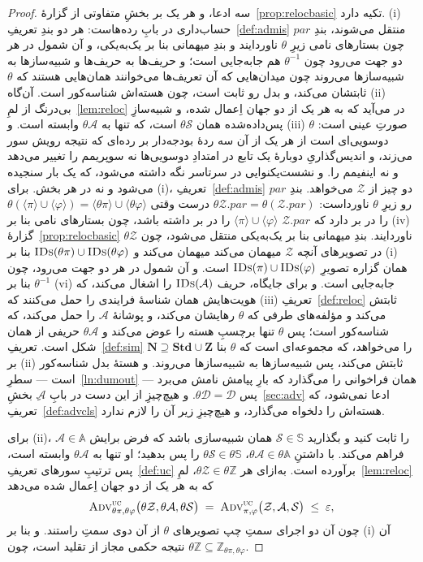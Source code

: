 \documentclass[10pt,oneside,openany]{book}
\newcommand{\admits}{\mathbf{N}}
\newcommand{\Zpid}{\mathbf{Z}}
\newcommand{\Stdpid}{\mathbf{Std}}
\newcommand{\pars}{\mathit{par}}
\newcommand{\Zenv}{\mathcal{Z}}
\newcommand{\Adv}{\mathcal{A}}
\newcommand{\Dum}{\mathcal{D}}
\newcommand{\Sim}{\mathcal{S}}
\newcommand{\advtg}{\op{Adv}}
\newcommand{\Aset}{\mathbb{A}}
\newcommand{\SimSet}{\mathbb{S}}
\newcommand{\ZenvSet}{\mathbb{Z}}
\newcommand{\op}[1]{\textnormal{\textsc{#1}}}
\newcommand{\IDs}{\op{IDs}}
\newcommand{\ncl}[1]{\langle #1 \rangle}
\theoremstyle{accentdef}
\theoremstyle{accentplain}
\begin{document}
\begin{proof}
سه ادعا، و هر یک بر بخشِ متفاوتی از گزارهٔ~\ref{prop:relocbasic} تکیه دارد.
(i) حساب‌داری در بابِ رده‌هاست: هر دو بندِ تعریفِ~\ref{def:admis} منتقل
می‌شوند، بندِ $\pars$ چون بستارهای نامی زیرِ $\theta$ ناوردایند و بندِ
میهمانی بنا بر یک‌به‌یکی، و آن شمول در هر دو جهت می‌رود چون $\theta^{-1}$
هم جابه‌جایی است؛ و حریف‌ها به حریف‌ها و شبیه‌سازها به شبیه‌سازها می‌روند
چون میدان‌هایی که آن تعریف‌ها می‌خوانند همان‌هایی هستند که $\theta$ ثابتشان
می‌کند، و بدل رو ثابت است، چون هسته‌اش شناسه‌کور است. آن‌گاه (ii) بی‌درنگ از
لمِ~\ref{lem:reloc} در می‌آید که به هر یک از دو جهان اِعمال شده، و
شبیه‌سازِ پس‌داده‌شده همان $\theta\Sim$ است، که تنها به $\theta\Adv$ وابسته
است. و (iii) صورتِ عینی است: $\theta$ دوسویی‌ای است از هر یک از آن سه ردهٔ
بودجه‌دار بر رده‌ای که نتیجه رویش سور می‌زند، و اندیس‌گذاریِ دوبارهٔ یک تابع
در امتدادِ دوسویی‌ها نه سوپریمم را تغییر می‌دهد و نه اینفیمم را. و
نشست‌یکنوایی در سرتاسر نگه داشته می‌شود، که یک بار سنجیده می‌شود و نه در
هر بخش.
برای (i)، تعریفِ~\ref{def:admis} دو چیز از $\Zenv$ می‌خواهد. بندِ $\pars$
رو زیرِ $\theta$ ناورداست: $\theta\Zenv.\pars = \theta(\Zenv.\pars)$ درست
وقتی $\theta(\ncl{\pi} \cup \ncl{\varphi}) = \ncl{\theta\pi} \cup
\ncl{\theta\varphi}$ را در بر دارد که $\Zenv.\pars$ $\ncl{\pi} \cup
\ncl{\varphi}$ را در بر داشته باشد، چون بستارهای نامی بنا بر (iv)ِ
گزارهٔ~\ref{prop:relocbasic} ناوردایند. بندِ میهمانی بنا بر یک‌به‌یکی منتقل
می‌شود، چون $\theta\Zenv$ در تصویرهای آنچه $\Zenv$ میهمان می‌کند میهمان
می‌کند و $\IDs(\theta\pi) \cup \IDs(\theta\varphi)$ بنا بر (i)ِ همان گزاره
تصویرِ $\IDs(\pi) \cup \IDs(\varphi)$ است. و آن شمول در هر دو جهت می‌رود،
چون $\theta^{-1}$ بنا بر (vi) جابه‌جایی است. و برای جایگاه، حریف
$\IDs(\Adv)$ را اشغال می‌کند، که هویت‌هایش همان شناسهٔ فرایندی را حمل
می‌کنند که (iii)ِ تعریفِ~\ref{def:reloc} ثابتش می‌کند و مؤلفه‌های طرفی که
$\theta$ رهایشان می‌کند، و پوشانهٔ $\Adv$ را حمل می‌کند، که شناسه‌کور است؛
پس $\theta$ تنها برچسبِ هسته را عوض می‌کند و $\theta\Adv$ حریفی از همان شکل
است. تعریفِ~\ref{def:sim} $\admits \supseteq \Stdpid \cup \Zpid$ را
می‌خواهد، که مجموعه‌ای است که $\theta$ بنا بر (ii) ثابتش می‌کند، پس
شبیه‌سازها به شبیه‌سازها می‌روند. و هستهٔ بدل شناسه‌کور است ---
سطرِ~\ref{ln:dumout} همان فراخوانی را می‌گذارد که بارِ پیامش نامش می‌برد
--- پس $\theta\Dum = \Dum$. و هیچ‌چیزِ از این دست در بابِ $\Adv$ِ
بخشِ~\ref{sec:adv} ادعا نمی‌شود، که تعریفِ~\ref{def:advcls} هسته‌اش را
دلخواه می‌گذارد، و هیچ‌چیزِ زیر آن را لازم ندارد.

برای (ii)، $\Adv \in \Aset$ را ثابت کنید و بگذارید $\Sim \in \SimSet$ همان
شبیه‌سازی باشد که فرض برایش فراهم می‌کند. با داشتنِ $\theta\Adv \in
\theta\Aset$، $\theta\Sim \in \theta\SimSet$ را پس بدهید؛ او تنها به
$\theta\Adv$ وابسته است، پس ترتیبِ سورهای تعریفِ~\ref{def:uc} برآورده
است. به‌ازای هر $\theta\Zenv \in \theta\ZenvSet$، لمِ~\ref{lem:reloc} که به
هر یک از دو جهان اِعمال شده می‌دهد
\[
  \advtg^{\op{uc}}_{\theta\pi,\theta\varphi}\bigl(\theta\Zenv,\theta\Adv,\theta\Sim\bigr)
  \;=\;
  \advtg^{\op{uc}}_{\pi,\varphi}\bigl(\Zenv,\Adv,\Sim\bigr)
  \;\leq\; \varepsilon ,
\]
چون آن دو اجرای سمتِ چپ تصویرهای $\theta$ از آن دوی سمتِ راستند. و بنا بر
(i) آن نتیجه حکمی مجاز از تقلید است، چون $\theta\ZenvSet \subseteq
\ZenvSet_{\theta\pi,\theta\varphi}$.


\end{proof}
\end{document}
